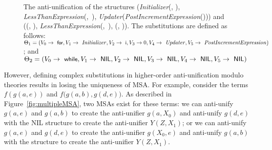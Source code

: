 \begin{figure}[t]
\centering{}
\caption{The anti-unification of the structures (\textit{Initializer}(, ), \mbox{\textit{LessThanExpression}(, ),} \textit{Updater}(\textit{PostIncrementExpression}())) and (\NIL{}(\NIL{}, \NIL{}), \mbox{\textit{LessThanExpression}(, ),} \NIL{}(\NIL{}, \NIL{})). The substitutions are defined as follows: $\Theta_1 = (V_0 \rightarrow \text{ \textsf{\small for}}, V_1 \rightarrow \text{ \textit{Initializer}}, V_2 \rightarrow \text{ \textsf{\small i}}, V_3 \rightarrow 0, V_4 \rightarrow \text{ \textit{Updater}}, V_5 \rightarrow \text{ \textit{PostIncrementExpression}})$; and $\Theta_2 = (V_0 \rightarrow \text{ \textsf{\small while}}, V_1 \rightarrow \text{ \textsf{NIL}}, V_2 \rightarrow \text{ \textsf{NIL}}, V_3 \rightarrow \text{ \textsf{NIL}}, V_4 \rightarrow \text{ \textsf{NIL}}, V_5 \rightarrow \text{ \textsf{NIL}})$\label{fig:for-while}}
\end{figure}

However, defining complex substitutions in higher-order anti-unification modulo theories results in losing the uniqueness of MSA. For example, consider the terms $f(g(a,e))$ and $f(g(a,b),$\linebreak$g(d,e))$. As described in Figure~\ref{fig:multipleMSA}, two MSAs exist for these terms: we can anti-unify $g(a,e)$ and $g(a,b)$ to create the anti-unifier $g(a,X_0)$ and anti-unify $g(d,e)$ with the NIL structure to create the anti-unifier $Y(Z,X_1)$; or we can anti-unify $g(a,e)$ and $g(d,e)$ to create the anti-unifier $g(X_0,e)$ and anti-unify $g(a,b)$ with the \NIL{} structure to create the anti-unifier $Y(Z,X_1)$.

